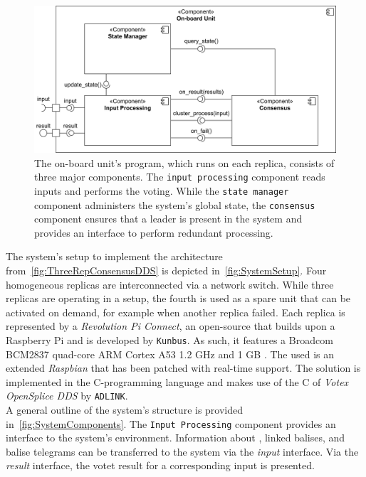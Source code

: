 \begin{figure}[!hb]
	\centering
	\includegraphics[width=0.9\linewidth]{images/Components}
	\caption{The on-board unit's program, which runs on each replica, consists of three major components. The \texttt{input processing} component reads inputs and performs the voting. While the \texttt{state manager} component administers the system's global state, the \texttt{consensus} component ensures that a leader is present in the system and provides an interface to perform redundant processing.}
	\label{fig:SystemComponents}
\end{figure}

The system's setup to implement the architecture from~\autoref{fig:ThreeRepConsensusDDS} is depicted in~\autoref{fig:SystemSetup}.
Four homogeneous replicas are interconnected via a network switch.
While three replicas are operating in a  setup, the fourth is used as a spare unit that can be activated on demand, for example when another replica failed.
Each replica is represented by a \textit{Revolution Pi Connect}, an open-source  that builds upon a Raspberry Pi and is developed by \texttt{Kunbus}.
As such, it features a Broadcom BCM2837 quad-core ARM Cortex A53 1.2 GHz  and 1 GB .
The used  is an extended \textit{Raspbian}  that has been patched with real-time support.
The solution is implemented in the C-programming language and makes use of the C  of \textit{Votex OpenSplice DDS} by \texttt{ADLINK}.
\\

A general outline of the system's structure is provided in~\autoref{fig:SystemComponents}.
The \texttt{Input Processing} component provides an interface to the system's environment.
Information about , linked balises, and balise telegrams can be transferred to the system via the \textit{input} interface.
Via the \textit{result} interface, the votet result for a corresponding input is presented.
\\

